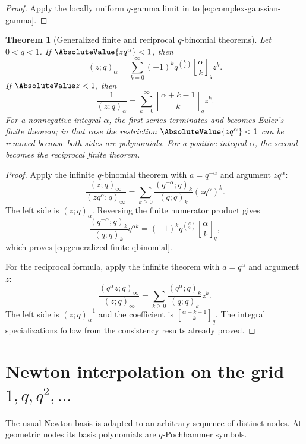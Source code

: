 \documentclass[11pt,a4paper,oneside,openany]{book}
\newtheorem{theorem}{Theorem}[chapter]
\theoremstyle{definition}
\theoremstyle{remark}
\begin{document}
\begin{proof}
Apply the locally uniform $q$-gamma limit in  to \eqref{eq:complex-gaussian-gamma}.
\end{proof}

\begin{theorem}[Generalized finite and reciprocal $q$-binomial theorems]\label{thm:generalized-qbinomial}
Let $0<q<1$.  If $\AbsoluteValue{zq^\alpha}<1$, then
\[
 (z;q)_\alpha
 =\sum_{k=0}^{\infty}(-1)^kq^{\binom k2}
   \genfrac{[}{]}{0pt}{}{\alpha}{k}_q z^k.
 \tag{17.13}\label{eq:generalized-finite-qbinomial}
\]
If $\AbsoluteValue z<1$, then
\[
 \frac1{(z;q)_\alpha}
 =\sum_{k=0}^{\infty}
   \genfrac{[}{]}{0pt}{}{\alpha+k-1}{k}_q z^k.
 \tag{17.14}\label{eq:generalized-reciprocal-qbinomial}
\]
For a nonnegative integral $\alpha$, the first series terminates and becomes Euler's finite theorem; in that case the restriction $\AbsoluteValue{zq^\alpha}<1$ can be removed because both sides are polynomials.  For a positive integral $\alpha$, the second becomes the reciprocal finite theorem.
\end{theorem}

\begin{proof}
Apply the infinite $q$-binomial theorem with
\(
 a=q^{-\alpha}
\)
and argument $zq^\alpha$:
\[
 \frac{(z;q)_\infty}{(zq^\alpha;q)_\infty}
 =\sum_{k\ge0}\frac{(q^{-\alpha};q)_k}{(q;q)_k}
 (zq^\alpha)^k.
\]
The left side is $(z;q)_\alpha$.  Reversing the finite numerator product gives
\[
 \frac{(q^{-\alpha};q)_k}{(q;q)_k}q^{\alpha k}
 =(-1)^kq^{\binom k2}
   \genfrac{[}{]}{0pt}{}{\alpha}{k}_q,
\]
which proves \eqref{eq:generalized-finite-qbinomial}.

For the reciprocal formula, apply the infinite theorem with $a=q^\alpha$ and argument $z$:
\[
 \frac{(q^\alpha z;q)_\infty}{(z;q)_\infty}
 =\sum_{k\ge0}\frac{(q^\alpha;q)_k}{(q;q)_k}z^k.
\]
The left side is $(z;q)_\alpha^{-1}$ and the coefficient is
$\genfrac{[}{]}{0pt}{}{\alpha+k-1}{k}_q$.  The integral specializations follow from the consistency results already proved.
\end{proof}

\section{Newton interpolation on the grid \texorpdfstring{$1,q,q^2,\ldots$}{1, q, q-squared, ...}}

The usual Newton basis is adapted to an arbitrary sequence of distinct nodes.  At geometric nodes its basis polynomials are $q$-Pochhammer symbols.
\end{document}
